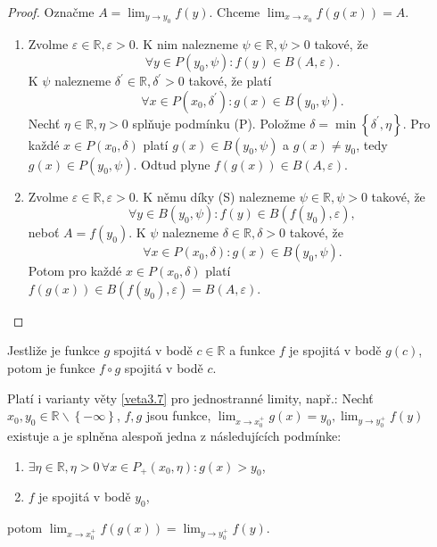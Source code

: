 \begin{proof}
	Označme $A=\lim_{y\to y_0}f(y)$. Chceme $\lim_{x\to x_0} f(g(x))=A$.
	\begin{enumerate}
		\item[(P)] Zvolme $\varepsilon \in \mathbb R , \varepsilon > 0$. K nim nalezneme
		$\psi \in \mathbb R , \psi > 0$ takové, že
		$$\forall y \in P(y_0, \psi): f(y)\in B(A, \varepsilon).$$
		K $\psi$ nalezneme $\delta^\prime \in \mathbb R , \delta ^\prime > 0$ takové, že platí
		$$
		    \forall x \in P(x_0,\delta^\prime): g(x)\in B(y_0,\psi).
		$$
		Nechť $\eta \in \mathbb R,\eta>0 $ splňuje podmínku (P). Položme
		$\delta = \min \left \{ \delta^\prime, \eta \right \} $.
		Pro každé $x \in P(x_0,\delta)$ platí $g(x)\in B(y_0,\psi)$ a $g(x)\ne y_0$, tedy $g(x)\in P(y_0, \psi)$.
		Odtud plyne $f(g(x))\in B(A,\varepsilon).$
		\item[(S)] Zvolme $\varepsilon \in \mathbb R , \varepsilon > 0$. K němu díky (S) nalezneme
		$\psi \in \mathbb R , \psi > 0 $ takové, že
		$$
		    \forall y \in B(y_0,\psi) : f(y) \in B(f(y_0), \varepsilon),
		$$
		neboť $A=f(y_0)$. K $\psi$ nalezneme $\delta \in \mathbb R ,\delta > 0$ takové, že
		$$
		    \forall x \in P(x_0, \delta):g(x) \in B(y_0, \psi).
		$$
		Potom pro každé $x \in P(x_0, \delta)$ platí $f(g(x)) \in B(f(y_0),\varepsilon)=B(A,\varepsilon)$. \qedhere
	\end{enumerate}
\end{proof}

\begin{dusledek}
	Jestliže je funkce $g$ spojitá v bodě $c\in \mathbb R $ a funkce $f$ je spojitá v bodě $g(c)$, potom
	je funkce $f\circ g$ spojitá v bodě $c$.
\end{dusledek}

\begin{poznamka}
	Platí i varianty věty \ref{veta3.7} pro jednostranné limity, např.: Nechť $x_0,y_0 \in \mathbb R \smallsetminus \left \{ -\infty \right \} $,
	$f,g$ jsou funkce, $\lim_{x\to x_0^+} g(x)=y_0,\lim_{y\to y_0^+} f(y)$ existuje a je splněna alespoň jedna z následujících
	podmínke:
	\begin{enumerate}
		\item[(P)] $\exists \eta \in \mathbb R , \eta > 0\, \forall x \in P_+(x_0,\eta):g(x)>y_0$,
		\item[(S)] $f$ je spojitá v bodě $y_0$,
\end{enumerate}
    potom $\lim_{x\to x_0^+} f(g(x))=\lim_{y\to y_0^+}f(y)$.
\end{poznamka}

